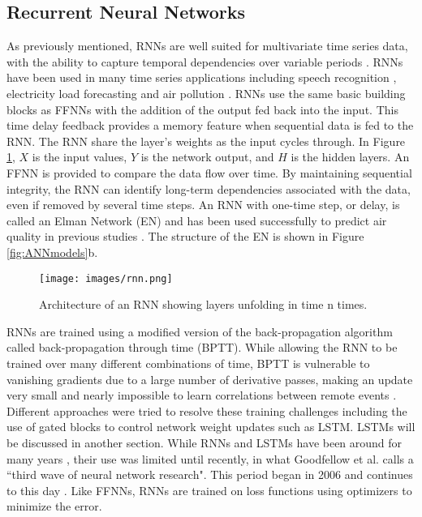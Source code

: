 \subsection{Recurrent Neural Networks}
As previously mentioned, RNNs are well suited for multivariate time series data, with the ability to capture temporal dependencies over variable periods \citep{Che2016}. RNNs have been used in many time series applications including speech recognition \citep{Graves2013}, electricity load forecasting \citep{Walid2017} and air pollution \citep{Gomez2003, Fan2017}. RNNs use the same basic building blocks as FFNNs with the addition of the output fed back into the input. This time delay feedback provides a memory feature when sequential data is fed to the RNN. The RNN share the layer's weights as the input cycles through. In Figure \ref{fig:rnn}, $X$ is the input values, $Y$ is the network output, and $H$ is the hidden layers. An FFNN is provided to compare the data flow over time. By maintaining sequential integrity, the RNN can identify long-term dependencies associated with the data, even if removed by several time steps. An RNN with one-time step, or delay, is called an Elman Network (EN) and has been used successfully to predict air quality in previous studies \citep{Biancofiore2015, Biancofiore2017}. The structure of the EN is shown in Figure \ref{fig:ANNmodels}b.

%
\begin{figure}[H]
\centering
\texttt{[image: images/rnn.png]}  %
\caption{Architecture of an RNN showing layers unfolding in time n times.}
\label{fig:rnn}
\end{figure}
%

RNNs are trained using a modified version of the back-propagation algorithm called back-propagation through time (BPTT). While allowing the RNN to be trained over many different combinations of time, BPTT is vulnerable to vanishing gradients due to a large number of derivative passes, making an update very small and nearly impossible to learn correlations between remote events \citep{Pascanu2013, Graves2013a}. Different approaches were tried to resolve these training challenges including the use of gated blocks to control network weight updates such as LSTM. LSTMs will be discussed in another section. While RNNs and LSTMs have been around for many years \citep{Hochreiter1997}, their use was limited until recently, in what Goodfellow et al. calls a ``third wave of neural network research". This period began in 2006 and continues to this day \citep{Goodfellow2016}. Like FFNNs, RNNs are trained on loss functions using optimizers to minimize the error. 

